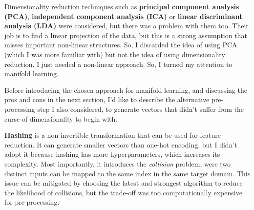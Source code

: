 Dimensionality reduction techniques such as \textbf{principal component analysis (PCA)},
\textbf{independent component analysis (ICA)} or \textbf{linear discriminant analysis (LDA)} were considered,
but there was a problem with them too.
Their job is to find a linear projection of the data, but this is a strong assumption that misses important non-linear
structures. So, I discarded the idea of using PCA (which I was more familiar with) but not the idea of using dimensionality
reduction. I just needed a non-linear approach. So, I turned my attention to manifold learning.

Before introducing the chosen approach for manifold learning, and discussing the pros and cons in the next section,
I'd like to describe the alternative pre-processing step I also considered,
to generate vectors that didn't suffer from the curse of dimensionality to begin with.

\textbf{Hashing} is a non-invertible transformation that can be used for feature reduction.
It can generate smaller vectors than one-hot encoding, but I didn't adopt it
because hashing has more hyperparameters, which increases its complexity.
Most importantly, it introduces the \textit{collision} problem,
were two distinct inputs can be mapped to the same index in the same target domain.
This issue can be mitigated by choosing the latest and strongest algorithm to reduce the likelihood of collisions,
but the trade-off was too computationally expensive for pre-processing.
